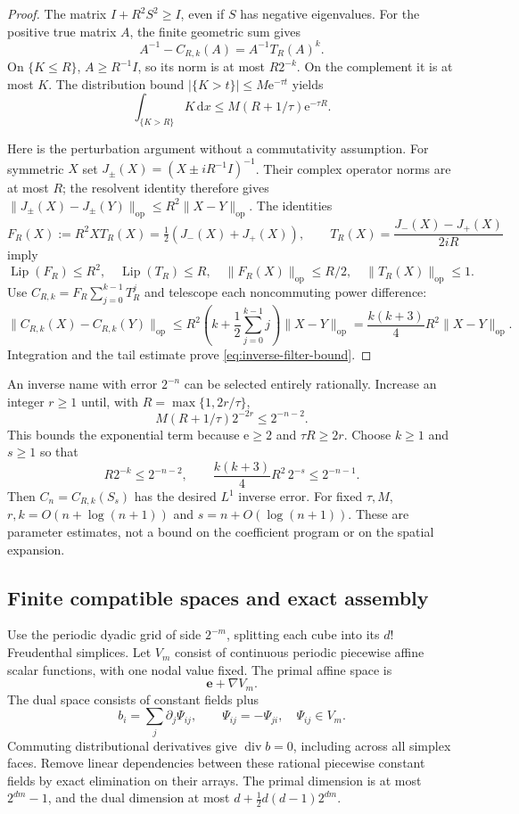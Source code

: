 \documentclass[11pt,a4paper]{article}
\numberwithin{equation}{section}
\theoremstyle{definition}
\theoremstyle{remark}\newtheorem{remark}[theorem]{Remark}
\DeclareMathOperator{\diver}{div}
\DeclareMathOperator{\Lip}{Lip}
\newcommand{\ee}{\mathrm e}
\newcommand{\Id}{I}
\newcommand{\dd}{\,\mathrm dx}
\newcommand{\norm}[1]{\lVert #1\rVert}
\newcommand{\op}{\mathrm{op}}
\newcommand{\evec}{\boldsymbol e}
\begin{document}
\begin{proof}
The matrix \(\Id+R^2S^2\geq\Id\), even if \(S\) has negative
eigenvalues. For the positive true matrix \(A\), the finite geometric
sum gives
\[
 A^{-1}-C_{R,k}(A)=A^{-1}T_R(A)^k.
\]
On \(\{K\leq R\}\), \(A\geq R^{-1}\Id\), so its norm is at most
\(R2^{-k}\). On the complement it is at most \(K\).
The distribution bound \(|\{K>t\}|\leq M\ee^{-\tau t}\) yields
\[
 \int_{\{K>R\}}K\dd
 \leq M(R+1/\tau)\ee^{-\tau R}.
\]

Here is the perturbation argument without a commutativity assumption.
For symmetric \(X\) set \(J_\pm(X)=(X\pm iR^{-1}\Id)^{-1}\).
Their complex operator norms are at most \(R\); the resolvent identity
therefore gives
\(\norm{J_\pm(X)-J_\pm(Y)}_{\op}\leq R^2\norm{X-Y}_{\op}\).
The identities
\[
 F_R(X):=R^2X T_R(X)=\tfrac12(J_-(X)+J_+(X)),\qquad
 T_R(X)=\frac{J_-(X)-J_+(X)}{2iR}
\]
imply
\[
 \Lip(F_R)\leq R^2,\quad \Lip(T_R)\leq R,\quad
 \norm{F_R(X)}_{\op}\leq R/2,\quad
 \norm{T_R(X)}_{\op}\leq1.
\]
Use \(C_{R,k}=F_R\sum_{j=0}^{k-1}T_R^j\) and telescope each
noncommuting power difference:
\[
 \norm{C_{R,k}(X)-C_{R,k}(Y)}_{\op}
 \leq R^2\left(k+\frac12\sum_{j=0}^{k-1}j\right)
                \norm{X-Y}_{\op}
 =\frac{k(k+3)}4R^2\norm{X-Y}_{\op}.
\]
Integration and the tail estimate prove \eqref{eq:inverse-filter-bound}.
\end{proof}

An inverse name with error \(2^{-n}\) can be selected entirely rationally.
Increase an integer \(r\geq1\) until, with \(R=\max\{1,2r/\tau\}\),
\[
 M(R+1/\tau)2^{-2r}\leq2^{-n-2}.
\]
This bounds the exponential term because \(\ee\geq2\) and \(\tau R\geq2r\).
Choose \(k\geq1\) and \(s\geq1\) so that
\[
 R2^{-k}\leq2^{-n-2},\qquad
 \frac{k(k+3)}4R^2\,2^{-s}\leq2^{-n-1}.
\]
Then \(C_n=C_{R,k}(S_s)\) has the desired \(L^1\) inverse error.
For fixed \(\tau,M\), \(r,k=O(n+\log(n+1))\) and
\(s=n+O(\log(n+1))\). These are parameter estimates, not a bound on
the coefficient program or on the spatial expansion.

\subsection{Finite compatible spaces and exact assembly}

Use the periodic dyadic grid of side \(2^{-m}\), splitting each cube
into its \(d!\) Freudenthal simplices. Let \(V_m\) consist of continuous
periodic piecewise affine scalar functions, with one nodal value fixed.
The primal affine space is
\[
 \evec+\nabla V_m.
\]
The dual space consists of constant fields plus
\[
 b_i=\sum_j\partial_j\Psi_{ij},\qquad
 \Psi_{ij}=-\Psi_{ji},\quad \Psi_{ij}\in V_m.
\]
Commuting distributional derivatives give \(\diver b=0\), including
across all simplex faces. Remove linear dependencies between these
rational piecewise constant fields by exact elimination on their arrays.
The primal dimension is at most \(2^{dm}-1\), and the dual dimension
at most \(d+\tfrac12d(d-1)2^{dm}\).
\end{document}
